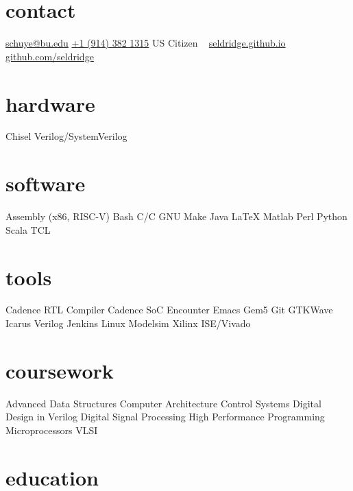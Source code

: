 \documentclass[print]{friggeri-cv} %
\begin{document}


\newcommand{\CPP}
{C\nolinebreak[4]\hspace{-.05em}\raisebox{.22ex}{\footnotesize ++}\xspace}

\begin{aside} %
\section{contact}
\href{mailto:schuye@bu.edu}{schuye@bu.edu}
\href{tel:+19143821315}{+1 (914) 382 1315}
US Citizen
~
\href{https://seldridge.github.io}{seldridge.github.io}
\href{https://github.com/seldridge}{github.com/seldridge}
\section{hardware}
Chisel
Verilog/SystemVerilog
\section{software}
Assembly (x86, RISC-V)
Bash
C/\CPP
GNU Make
Java
\LaTeX
Matlab
Perl
Python
Scala
TCL
\section{tools}
Cadence RTL Compiler
Cadence SoC Encounter
Emacs
Gem5
Git
GTKWave
Icarus Verilog
Jenkins
Linux
Modelsim
Xilinx ISE/Vivado
\section{coursework}
Advanced Data Structures
Computer Architecture
Control Systems
Digital Design in Verilog
Digital Signal Processing
High Performance Programming
Microprocessors
VLSI
\end{aside}


\section{education}
\end{document}

